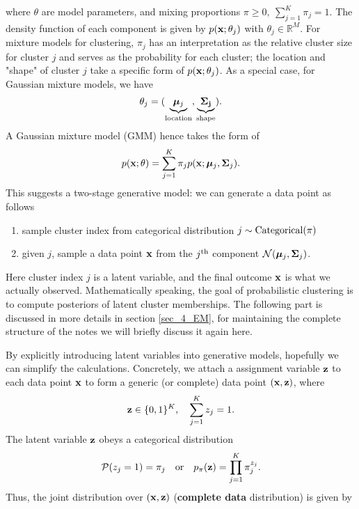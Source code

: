 \documentclass[../main.tex]{subfiles}
\begin{document}
where $\theta$ are model parameters, and mixing proportions $\pi \geq 0,\ \sum_{j=1}^{K}\pi_j=1$. The density function of each component is given by $p({\bf x};\theta_j)$ with $\theta_j\in\mathbb{R}^M$. For mixture models for clustering, $\pi_j$ has an interpretation as the relative cluster size for cluster $j$ and serves as the probability for each cluster; the location and "shape" of cluster $j$ take a specific form of $p({\bf x};\theta_j)$. As a special case, for Gaussian mixture models, we have 
\begin{equation*}
\theta_j=(\underbrace{\bm{\mu}_j}_{\rm location},\underbrace{{\bf \Sigma_j}}_{\rm shape}).
\end{equation*}
A Gaussian mixture model (GMM) hence takes the form of
\begin{equation*}
p({\bf x};\theta)=\sum_{j=1}^{K}\pi_j p({\bf x};\bm{\mu}_j,{\bf \Sigma}_j).
\end{equation*}
This suggests a two-stage generative model: we can generate a data point as follows
\begin{enumerate}
	\item sample cluster index from categorical distribution $j\sim {\rm Categorical}(\pi)$
	\item given $j$, sample a data point ${\bf x}$ from the $j^{\rm th}$ component $\mathcal{N}(\bm{\mu}_j,{\bf \Sigma}_j)$.
\end{enumerate}
Here cluster index $j$ is a latent variable, and the final outcome ${\bf x}$ is what we actually observed. Mathematically speaking, the goal of probabilistic clustering is to compute posteriors of latent cluster memberships. The following part is discussed in more details in section \ref{sec_4_EM}, for maintaining the complete structure of the notes we will briefly discuss it again here.
\par By explicitly introducing latent variables into generative models, hopefully we can simplify the calculations. Concretely, we attach a assignment variable ${\bf z}$ to each data point ${\bf x}$ to form a generic (or complete) data point $({\bf x,z})$, where
\begin{equation*}
{\bf z}\in\{0,1\}^{K},\quad \sum_{j=1}^{K}z_j=1.
\end{equation*}
The latent variable ${\bf z}$ obeys a categorical distribution
\begin{equation*}
\mathcal{P}(z_j=1)=\pi_j\quad {\rm or}\quad p_{\pi}({\bf z}) =\prod_{j=1}^{K}\pi_j^{z_j}.
\end{equation*}
Thus, the joint distribution over $({\bf x, z})$ (\textbf{complete data} distribution) is given by
\end{document}
